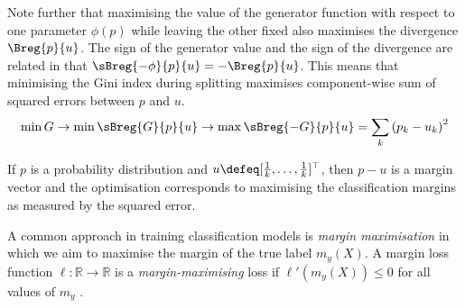 \documentclass[../main.tex]{subfiles}
\begin{document}
Note further that maximising the value of the generator function with respect to one parameter $\phi(p)$ while leaving the other fixed also maximises the divergence $\Breg{p}{u}$.
The sign of the generator value and the sign of the divergence are related in that  $\sBreg{-\phi}{p}{u} = - \Breg{p}{u}$.
This means that minimising the Gini index during splitting maximises component-wise sum of squared errors between $p$ and $u$.
$$
\min G \rightarrow \min \sBreg{G}{p}{u} \rightarrow \max \sBreg{-G}{p}{u} = \sum_{k}\left( p_{k} - u_k \right)^2
$$

If $p$ is a probability distribution and $u \defeq [\frac{1}{k}, \dots, \frac{1}{k}]^\top$, then $p-u$ is a margin vector and the optimisation corresponds to maximising the classification margins as measured by the squared error.

A common approach in training classification models
is \textit{margin maximisation} \cite{schapire_BoostingFoundationsAlgorithms_2012}
in which we aim to maximise the margin of the true label $m_{y}(X)$. 
A margin loss function $\ell : \mathbb{R} \to \mathbb{R}$ is a \textit{margin-maximising} loss if $\ell'(m_{y}(X)) \leq 0$ for all values of $m_{y}$ \cite{leistner_SemiSupervisedRandomForests_2009}.
\end{document}

